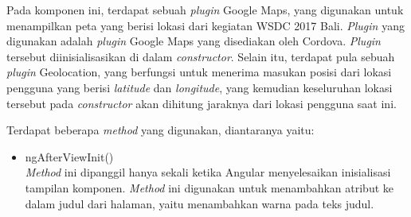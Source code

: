 \begin{enumerate}
\newpage	
	
	Pada komponen ini, terdapat sebuah \textit{plugin} Google Maps, yang digunakan untuk menampilkan peta yang berisi lokasi dari kegiatan WSDC 2017 Bali. \textit{Plugin} yang digunakan adalah \textit{plugin} Google Maps yang disediakan oleh Cordova. \textit{Plugin} tersebut diinisialisasikan di dalam \textit{constructor}. Selain itu, terdapat pula sebuah \textit{plugin} Geolocation, yang berfungsi untuk menerima masukan posisi dari lokasi pengguna yang berisi \textit{latitude} dan \textit{longitude}, yang kemudian keseluruhan lokasi tersebut pada \textit{constructor} akan dihitung jaraknya dari lokasi pengguna saat ini. 
	
	Terdapat beberapa \textit{method} yang digunakan, diantaranya yaitu:
	
	\begin{itemize}
		\item ngAfterViewInit()\\
		\textit{Method} ini dipanggil hanya sekali ketika Angular menyelesaikan inisialisasi tampilan komponen. \textit{Method} ini digunakan untuk menambahkan atribut ke dalam judul dari halaman, yaitu menambahkan warna pada teks judul.
	

\end{itemize}
\end{enumerate}
